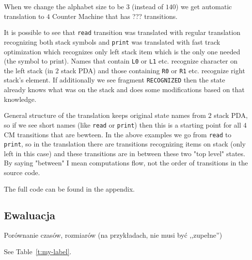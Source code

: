 \documentclass[english,shortabstract,mgr]{iithesis}
\begin{document}
When we change the alphabet size to be $3$ (instead of $140$) we get
automatic translation to $4$ Counter Machine that has ??? transitions.

It is possible to see that \texttt{read} transition was translated with
regular translation recognizing both stack symbols and \texttt{print}
was translated with fast track optimization which recognizes only
left stack item which is the only one needed (the symbol to print).
Names that contain \texttt{L0} or \texttt{L1} etc. recognize character
on the left stack (in $2$ stack PDA) and those containing \texttt{R0}
or \texttt{R1} etc. recognize right stack's element. If additionally
we see fragment \texttt{RECOGNIZED} then the state already knows what
was on the stack and does some modifications based on that knowledge.

General structure of the translation keeps original state names from
$2$ stack PDA, so if we see short names (like \texttt{read} or \texttt{print})
then this is a starting point for all $4$CM transitions that are bewteen.
In the above examples we go from \texttt{read} to \texttt{print}, so in
the translation there are transitions recognizing items on stack (only left in
this case) and these transitions are in between these two "top level" states.
By saying "between" I mean computations flow, not the order of transitions
in the source code.

The full code can be found in the appendix.

\newpage

\subsection{Ewaluacja}

Porównanie czasów, rozmiarów (na przykładach, nie musi być ,,zupełne'')

See Table~\ref{t:my-label}.
\end{document}
